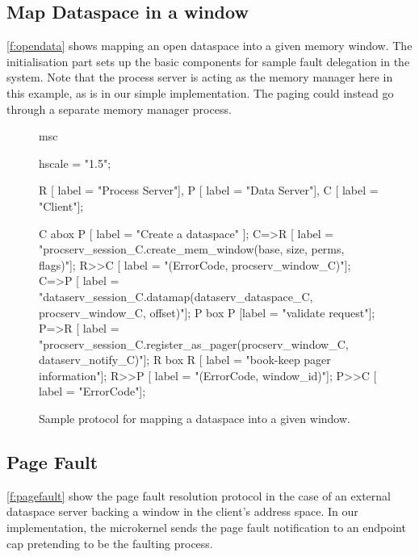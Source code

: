 \subsection{Map Dataspace in a window}

\autoref{f:opendata} shows mapping an open dataspace into a given memory window.  The initialisation
part sets up the basic components for sample fault delegation in the system.  Note that the process
server is acting as the memory manager here in this example, as is in our simple implementation. The
paging could instead go through a separate memory manager process.

\begin{figure}[htb]
  \begin{center}
    \begin{msc}
      msc {
        hscale = "1.5";

        R [ label = "Process Server"],
        P [ label = "Data Server"],
        C [ label = "Client"];

        C abox P [ label = "Create a dataspace" ];
        C=>R [ label = "procserv\_session\_C.create\_mem\_window(base, size, perms, flags)"];
        R>>C [ label = "(ErrorCode, procserv\_window\_C)"];
        C=>P [ label = "dataserv\_session\_C.datamap(dataserv\_dataspace\_C, procserv\_window\_C, offset)"];
        P box P [label = "validate request"];
        P=>R [ label = "procserv\_session\_C.register\_as\_pager(procserv\_window\_C, dataserv\_notify\_C)"];
        R box R [ label = "book-keep pager information"];
        R>>P [ label = "(ErrorCode, window\_id)"];
        P>>C [ label = "ErrorCode"];
      }
    \end{msc}
  \end{center}
  \caption{Sample protocol for mapping a dataspace into a given window.}
  \label{f:opendata}
\end{figure}

\subsection{Page Fault}

\autoref{f:pagefault} show the page fault resolution protocol in the case of an external dataspace
server backing a window in the client's address space. In our implementation, the \seLf microkernel
sends the page fault notification to an endpoint cap pretending to be the faulting process.

